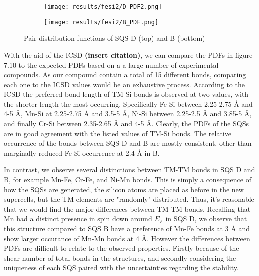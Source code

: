 \begin{figure}[H]
	\centering
	\begin{subfigure}{\textwidth}
		\texttt{[image: results/fesi2/D\_PDF2.png]}
	\end{subfigure}
	\begin{subfigure}{\textwidth}
		\texttt{[image: results/fesi2/B\_PDF.png]}
	\end{subfigure}
	\caption{Pair distribution functions of SQS D (top) and B (bottom)}
\end{figure}

With the aid of the ICSD \textbf{(insert citation)}, we can compare the PDFs in figure 7.10 to the expected PDFs based on a a large number of experimental compounds. As our compound contain a total of 15 different bonds, comparing each one to the ICSD values would be an exhaustive process. According to the ICSD   the preferred bond-length of TM-Si bonds is observed at two values, with the shorter length the most occurring. Specifically Fe-Si between 2.25-2.75 Å and 4-5 Å, Mn-Si at 2.25-2.75 Å and 3.5-5 Å, Ni-Si between 2.25-2.5 Å and 3.85-5 Å, and finally Cr-Si between 2.35-2.65 Å and 4-5 Å. Clearly, the PDFs of the SQSs are in good agreement with the listed values of TM-Si bonds. The relative occurrence of the bonds between SQS D and B are mostly consistent, other than marginally reduced Fe-Si occurrence at 2.4 Å in B.

In contrast, we observe several distinctions between TM-TM bonds in SQS D and B, for example Mn-Fe, Cr-Fe, and Ni-Mn bonds. This is simply a consequence of how the SQSs are generated, the silicon atoms are placed as before in the new supercells, but the TM elements are "randomly" distributed. Thus, it's reasonable that we would find the major differences between TM-TM bonds. Recalling that Mn had a distinct presence in spin down around $E_F$ in SQS D, we observe that this structure compared to SQS B have a preference of Mn-Fe bonds at 3 Å and show larger occurance of Mn-Mn bonds at 4 Å. However the differences between PDFs are difficult to relate to the observed properties. Firstly because of the shear number of total bonds in the structures, and secondly considering the uniqueness of each SQS paired with the uncertainties regarding the stability.

\newpage
